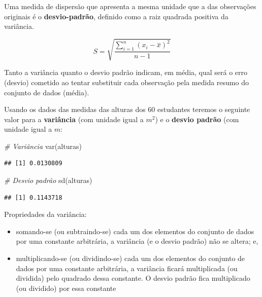 \documentclass[
]{book}
\newenvironment{Shaded}{\begin{snugshade}}{\end{snugshade}}
\newcommand{\CommentTok}[1]{\textcolor[rgb]{0.56,0.35,0.01}{\textit{#1}}}
\newcommand{\FunctionTok}[1]{\textcolor[rgb]{0.00,0.00,0.00}{#1}}
\newcommand{\NormalTok}[1]{#1}
\providecommand{\tightlist}{%
  \setlength{\itemsep}{0pt}\setlength{\parskip}{0pt}}
\begin{document}
\hfill\break

Uma medida de dispersão que apresenta a mesma unidade que a das observações originais é o \textbf{desvio-padrão}, definido como a raiz quadrada positiva da variância.

\hfill\break

\[
S= \sqrt{\frac{\sum _{i=1}^{n}\left(x_{i}-\stackrel{-}{x}\right)^{2}}{n-1}}
\]

\hfill\break

Tanto a variância quanto o desvio padrão indicam, em média, qual será o erro (desvio) cometido ao tentar substituir cada observação pela medida resumo do conjunto de dados (média).

\hfill\break

Usando os dados das medidas das alturas dos 60 estudantes teremos o seguinte valor para a \textbf{variância} (com unidade igual a \(m^{2}\)) e o \textbf{desvio padrão} (com unidade igual a \(m\):

\hfill\break

\begin{Shaded}
\begin{Highlighting}[]
\CommentTok{\# Variãncia}
\FunctionTok{var}\NormalTok{(alturas)}
\end{Highlighting}
\end{Shaded}

\begin{verbatim}
## [1] 0.0130809
\end{verbatim}

\begin{Shaded}
\begin{Highlighting}[]
\CommentTok{\# Desvio padrão}
\FunctionTok{sd}\NormalTok{(alturas) }
\end{Highlighting}
\end{Shaded}

\begin{verbatim}
## [1] 0.1143718
\end{verbatim}

Propriedades da variância:

\hfill\break

\begin{itemize}
\tightlist
\item
  somando-se (ou subtraindo-se) cada um dos elementos do conjunto de dados por uma constante arbitrária, a variância (e o desvio padrão) não se altera; e,
\item
  multiplicando-se (ou dividindo-se) cada um dos elementos do conjunto de dados por uma constante arbitrária, a variância ficará multiplicada (ou dividida) pelo quadrado dessa constante. O desvio padrão fica multiplicado (ou dividido) por essa constante
\end{itemize}
\end{document}
